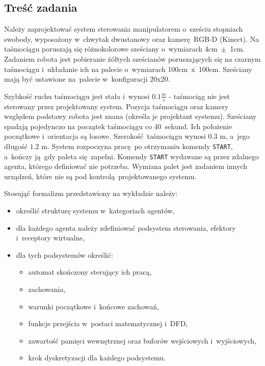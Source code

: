 \subsection{Treść zadania}
\label{subsec:polecenie}
Należy zaprojektować system sterowania manipulatorem o~sześciu stopniach swobody, wyposażony w~chwytak dwustanowy oraz kamerę RGB-D (Kinect). Na taśmociągu poruszają się różnokolorowe sześciany o~wymiarach 4cm~$\pm$~1cm. Zadaniem robota jest pobieranie żółtych sześcianów poruszających się na czarnym taśmociągu i~układanie ich na palecie o~wymiarach 100cm~x~100cm. Sześciany mają być ustawione na~palecie w~konfiguracji 20x20. 

Szybkość ruchu taśmociągu jest stała i~wynosi $\num{0,1}\frac{m}{s}$ - taśmociąg nie jest sterowany przez projektowany system. Pozycja taśmociągu oraz kamery względem podstawy robota jest znana (określa je projektant systemu). Sześciany spadają pojedynczo na początek taśmociągu co 40~sekund. Ich położenie początkowe i~orientacja są losowe. Szerokość taśmociągu wynosi $\num{0.3}$ m, a~jego długość $\num{1,2}$ m. System rozpoczyna pracę po otrzymaniu komendy \texttt{START}, a~kończy ją gdy paleta się zapełni. Komendy \texttt{START} wydawane są przez zdalnego agenta, którego definiować nie potrzeba. Wymiana palet jest zadaniem innych urządzeń, które nie są pod kontrolą projektowanego systemu.

Stosująć formalizm przedstawiony na wykładzie należy:
\begin{itemize}
    \item określić strukturę systemu w~kategoriach agentów,
    \item dla każdego agenta należy zdefiniować podsystem sterowania, efektory i~receptory wirtualne,
    \item dla tych podsystemów określić:
    \begin{itemize}
        \item automat skończony sterujący ich pracą,
        \item zachowania,
        \item warunki początkowe i~końcowe zachowań,
        \item funkcje przejścia w~postaci matematycznej i~DFD,
        \item zawartość pamięci wewnętrznej oraz buforów wejściowych i~wyjściowych,
        \item krok dyskretyzacji dla każdego podsystemu.
    \end{itemize}
\end{itemize}
